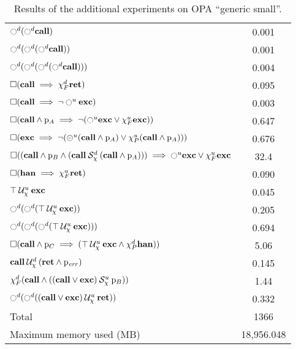 \documentclass{article}
\begin{document}
\begin{table}
\begin{tabular}{| l | c |}
$\ocircle^d (\ocircle^d \mathbf{call})$ & 0.001 \\
$\ocircle^d (\ocircle^d (\ocircle^d \mathbf{call}))$ & 0.001 \\
$\ocircle^d (\ocircle^d (\ocircle^d (\ocircle^d \mathbf{call})))$ & 0.004 \\
$\square (\mathbf{call} \implies \chi_F^{d} \mathbf{ret})$ & 0.095 \\
$\square (\mathbf{call} \implies \neg \ocircle^u \mathbf{exc})$ & 0.003 \\
$\square (\mathbf{call} \land \mathrm{p}_A \implies \neg (\ocircle^u \mathbf{exc} \lor \chi_F^{u} \mathbf{exc}))$ & 0.647 \\
$\square (\mathbf{exc} \implies \neg (\circleddash^u (\mathbf{call} \land \mathrm{p}_A) \lor \chi_P^{u} (\mathbf{call} \land \mathrm{p}_A)))$ & 0.676 \\
$\square ((\mathbf{call} \land \mathrm{p}_B \land ({\mathbf{call}} \mathbin{\mathcal{S}_\chi^d} {(\mathbf{call} \land \mathrm{p}_A)})) \implies \ocircle^u \mathbf{exc} \lor \chi_F^{u} \mathbf{exc}$ & 32.4 \\
$\square (\mathbf{han} \implies \chi_F^{u} \mathbf{ret})$ & 0.090 \\
${\top} \mathbin{\mathcal{U}_\chi^u} {\mathbf{exc}}$ & 0.045 \\
$\ocircle^d (\ocircle^d ({\top} \mathbin{\mathcal{U}_\chi^u} {\mathbf{exc}}))$ & 0.205 \\
$\ocircle^d (\ocircle^d (\ocircle^d ({\top} \mathbin{\mathcal{U}_\chi^u} {\mathbf{exc}})))$ & 0.694 \\
$\square (\mathbf{call} \land \mathrm{p}_C \implies ({\top} \mathbin{\mathcal{U}_\chi^u} {\mathbf{exc} \land \chi_P^{d} \mathbf{han}}))$ & 5.06 \\
${\mathbf{call}} \mathbin{\mathcal{U}_\chi^d} {(\mathbf{ret} \land \mathrm{p}_\mathit{err})}$ & 0.145 \\
$\chi_F^{d} (\mathbf{call} \land ({(\mathbf{call} \lor \mathbf{exc})} \mathbin{\mathcal{S}_\chi^u} {\mathrm{p}_B}))$ & 1.44 \\
$\ocircle^d (\ocircle^d ({(\mathbf{call} \lor \mathbf{exc})} \mathbin{\mathcal{U}_\chi^u} {\mathbf{ret}}))$ & 0.332 \\
\hline
Total & 1366 \\
\hline
\hline
Maximum memory used (MB) & 18,956.048 \\
\hline
\end{tabular}
\caption{Results of the additional experiments on OPA ``generic small''.}
\label{tab:more-exp-1}
\end{table}
\end{document}
